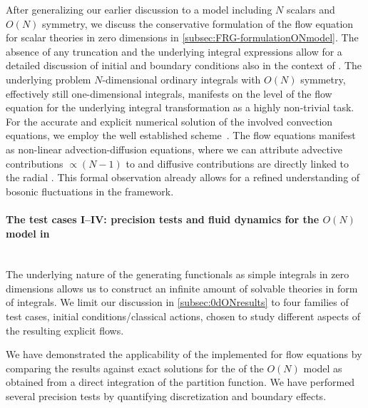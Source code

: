 After generalizing our earlier discussion to a model including $N$ scalars and $O(N)$ symmetry, we discuss the conservative formulation of the \frg{} flow equation for scalar theories in zero dimensions in \cref{subsec:FRG-formulationONmodel}.
The absence of any truncation and the underlying integral expressions allow for a detailed discussion of initial and boundary conditions also in the context of \rgcy{}.
The underlying problem \dash{} $N$-dimensional ordinary integrals with $O(N)$ symmetry, \viz{} effectively still one-dimensional integrals, manifests on the level of the \frg{} flow equation for the underlying integral transformation as a highly non-trivial task.
For the accurate and explicit numerical solution of the involved convection equations, we employ the well established   scheme~\cite{KTO2-0,KTO2-1}.
The flow equations manifest as non-linear advection-diffusion equations, where we can attribute advective contributions $\propto (N-1)$ to \pionModes{} and diffusive contributions are directly linked to the radial \sigmaMode{}.
This formal observation already allows for a refined understanding of bosonic fluctuations in the \frg{} framework.

\paragraph{The test cases I--IV: precision tests and fluid dynamics for the $O(N)$ model in \dzero{}}\label{paragraph:0dconclusionTest}\mbox{}\\%
The underlying nature of the generating functionals as simple integrals in zero dimensions allows us to construct an infinite amount of solvable theories in form of integrals.
We limit our discussion in \cref{subsec:0dONresults} to four families of test cases, \viz{} \uv{} initial conditions/classical actions, chosen to study different aspects of the resulting explicit \frg{} flows.

We have demonstrated the applicability of the implemented \ktScheme{} for \frg{} flow equations by comparing the results against exact solutions for the \nptFunctions{} of the $O(N)$ model as obtained from a direct integration of the partition function.
We have performed several precision tests by quantifying discretization and boundary effects.

